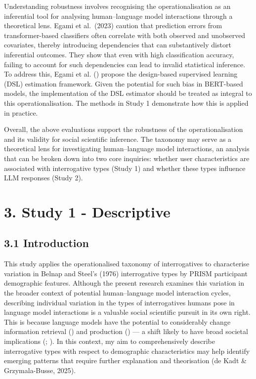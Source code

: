 \documentclass[
  12pt,
]{article}
\begin{document}
Understanding robustness involves recognising the operationalisation as an inferential tool for analysing human--language model interactions through a theoretical lens. Egami et al.~(2023) caution that prediction errors from transformer-based classifiers often correlate with both observed and unobserved covariates, thereby introducing dependencies that can substantively distort inferential outcomes. They show that even with high classification accuracy, failing to account for such dependencies can lead to invalid statistical inference. To address this, Egami et al. () propose the design-based supervised learning (DSL) estimation framework. Given the potential for such bias in BERT-based models, the implementation of the DSL estimator should be treated as integral to this operationalisation. The methods in Study 1 demonstrate how this is applied in practice.

Overall, the above evaluations support the robustness of the operationalisation and its validity for social scientific inference. The taxonomy may serve as a theoretical lens for investigating human--language model interactions, an analysis that can be broken down into two core inquiries: whether user characteristics are associated with interrogative types (Study 1) and whether these types influence LLM responses (Study 2).

\section{3. Study 1 - Descriptive}\label{study-1---descriptive}

\subsection{3.1 Introduction}\label{introduction-1}

This study applies the operationalised taxonomy of interrogatives to characterise variation in Belnap and Steel's (1976) interrogative types by PRISM participant demographic features. Although the present research examines this variation in the broader context of potential human--language model interaction cycles, describing individual variation in the types of interrogatives humans pose in language model interactions is a valuable social scientific pursuit in its own right. This is because language models have the potential to considerably change information retrieval () and production () --- a shift likely to have broad societal implications (; ). In this context, my aim to comprehensively describe interrogative types with respect to demographic characteristics may help identify emerging patterns that require further explanation and theorisation (de Kadt \& Grzymala-Busse, 2025).
\end{document}

